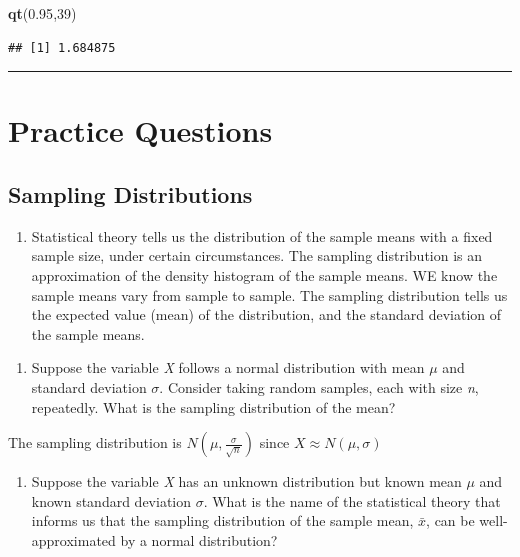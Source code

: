 \documentclass[
  openany]{book}
\newenvironment{Shaded}{\begin{snugshade}}{\end{snugshade}}
\newcommand{\DecValTok}[1]{\textcolor[rgb]{0.00,0.00,0.81}{#1}}
\newcommand{\FloatTok}[1]{\textcolor[rgb]{0.00,0.00,0.81}{#1}}
\newcommand{\FunctionTok}[1]{\textcolor[rgb]{0.13,0.29,0.53}{\textbf{#1}}}
\newcommand{\NormalTok}[1]{#1}
\providecommand{\tightlist}{%
  \setlength{\itemsep}{0pt}\setlength{\parskip}{0pt}}
\begin{document}
\begin{Shaded}
\begin{Highlighting}[]
\FunctionTok{qt}\NormalTok{(}\FloatTok{0.95}\NormalTok{,}\DecValTok{39}\NormalTok{)}
\end{Highlighting}
\end{Shaded}

\begin{verbatim}
## [1] 1.684875
\end{verbatim}

\begin{center}\rule{0.5\linewidth}{0.5pt}\end{center}

\newpage

\section{Practice Questions}\label{practice-questions}

\subsection{Sampling Distributions}\label{sampling-distributions-1}

\begin{enumerate}
\def\labelenumi{\arabic{enumi}.}
\tightlist
\item
  Statistical theory tells us the distribution of the sample means with a fixed sample size, under certain circumstances. The sampling distribution is an approximation of the density histogram of the sample means. WE know the sample means vary from sample to sample. The sampling distribution tells us the expected value (mean) of the distribution, and the standard deviation of the sample means.
\end{enumerate}

\begin{enumerate}
\def\labelenumi{\alph{enumi}.}
\tightlist
\item
  Suppose the variable \emph{X} follows a normal distribution with mean \(\mu\) and standard deviation \(\sigma\). Consider taking random samples, each with size \emph{n}, repeatedly. What is the sampling distribution of the mean?
\end{enumerate}

The sampling distribution is \(N(\mu,\frac{\sigma}{\sqrt{n}})\) since \(X\approx N(\mu,\sigma)\)

\begin{enumerate}
\def\labelenumi{\alph{enumi}.}
\setcounter{enumi}{1}
\tightlist
\item
  Suppose the variable \emph{X} has an unknown distribution but known mean \(\mu\) and known standard deviation \(\sigma\). What is the name of the statistical theory that informs us that the sampling distribution of the sample mean, \(\bar{x}\), can be well-approximated by a normal distribution?
\end{enumerate}
\end{document}
